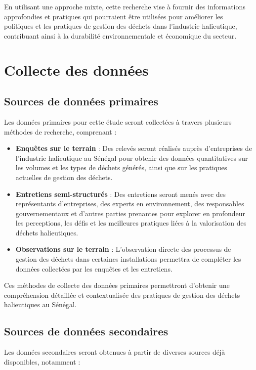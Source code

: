\documentclass[12pt,a4paper]{report}
\begin{document}
En utilisant une approche mixte, cette recherche vise à fournir des informations approfondies et pratiques qui pourraient être utilisées pour améliorer les politiques et les pratiques de gestion des déchets dans l'industrie halieutique, contribuant ainsi à la durabilité environnementale et économique du secteur.

\section{Collecte des données}

\subsection{Sources de données primaires}

Les données primaires pour cette étude seront collectées à travers plusieurs méthodes de recherche, comprenant :

\begin{itemize}
    \item \textbf{Enquêtes sur le terrain} : Des relevés seront réalisés auprès d'entreprises de l'industrie halieutique au Sénégal pour obtenir des données quantitatives sur les volumes et les types de déchets générés, ainsi que sur les pratiques actuelles de gestion des déchets.
    \item \textbf{Entretiens semi-structurés} : Des entretiens seront menés avec des représentants d'entreprises, des experts en environnement, des responsables gouvernementaux et d'autres parties prenantes pour explorer en profondeur les perceptions, les défis et les meilleures pratiques liées à la valorisation des déchets halieutiques.
    \item \textbf{Observations sur le terrain} : L'observation directe des processus de gestion des déchets dans certaines installations permettra de compléter les données collectées par les enquêtes et les entretiens.
\end{itemize}

Ces méthodes de collecte des données primaires permettront d'obtenir une compréhension détaillée et contextualisée des pratiques de gestion des déchets halieutiques au Sénégal.

\subsection{Sources de données secondaires}

Les données secondaires seront obtenues à partir de diverses sources déjà disponibles, notamment :
\end{document}
